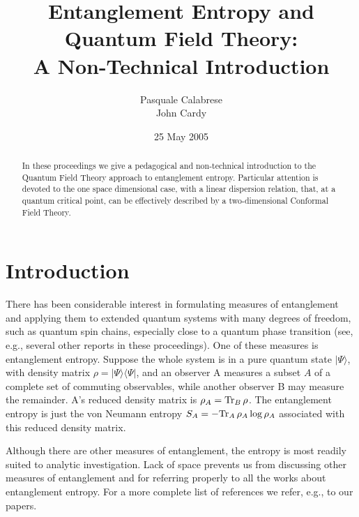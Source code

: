 \documentclass[12pt]{article}
\begin{document}
\title{Entanglement Entropy and Quantum Field Theory:\\ A Non-Technical Introduction}

\author{Pasquale Calabrese \\ John Cardy}
\date{25 May 2005}

\maketitle


\begin{abstract}
In these proceedings we give a pedagogical and non-technical 
introduction to the Quantum Field Theory approach to entanglement
entropy.
Particular attention is devoted to the one space dimensional 
case, with a linear dispersion relation, that, at a quantum critical
point, can be effectively described by a two-dimensional Conformal 
Field Theory. 
\end{abstract}

\section{Introduction}

There has been considerable interest in formulating measures of
entanglement and applying them to extended quantum systems with
many degrees of freedom, such as quantum spin chains, especially close to 
a quantum phase transition (see, e.g., several other reports in these 
proceedings). 
One of these measures is entanglement entropy.\cite{Bennett} 
Suppose the whole system is in a pure quantum state $|\Psi\rangle$, with 
density matrix $\rho=|\Psi\rangle\langle\Psi|$, and an observer A measures 
a subset $A$ of a complete set of commuting observables, while another
observer B may measure the remainder. A's reduced density matrix is
$\rho_A={\rm Tr}_B\,\rho$. The entanglement entropy is just the von
Neumann entropy $S_A=-{\rm Tr}_A\,\rho_A\log\rho_A$ associated with this
reduced density matrix.

Although there are other measures of entanglement,
the entropy is most readily suited to analytic investigation.
Lack of space prevents us from discussing other measures of entanglement 
and for referring properly to all the works about entanglement entropy.
For a more complete list of references we refer, e.g., to our 
papers.\cite{cc-04,cc-05}
\end{document}
